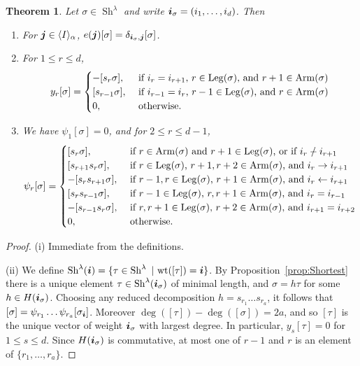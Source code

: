 \documentclass[twoside,11pt,reqno,letter]{amsart}
\numberwithin{equation}{section}
\newtheorem{Theorem}[equation]{Theorem}
\theoremstyle{definition}  %
\def\bi{\text{\boldmath$i$}}
\def\bj{\text{\boldmath$j$}}
\newcommand{\words}{\langle I \rangle}
\newcommand{\Arm}{\operatorname{Arm}}
\newcommand{\Leg}{\operatorname{Leg}}
\newcommand{\Sh}{\operatorname{Sh}}
\newcommand{\0}{{\bar 0}}
\newcommand{\1}{{\bar 1}}
\newcommand{\la}{\lambda}
\newcommand{\al}{\alpha}
\newcommand{\si}{\sigma}
\newcommand{\de}{\delta}
\def\nslash{\:\notslash\:}
\def\wt{{\operatorname{wt}}}
\begin{document}
{\begin{Theorem}\label{thm:KLRonBasis}
  Let $\si \in \Sh^\la$ and write $\bi_\si = (i_1, \dots, i_d)$. Then
  \begin{enumerate}
    \item For $\bj \in \words_\al$, $e(\bj) [\si] = \de_{\bi_\si, \bj} [\si]$.
    \item For $1 \leq r \leq d$,
          \[ y_r [\si] = \begin{cases}
             -[s_r \si],& \textup{ if $i_r = i_{r+1}$, $r \in \Leg(\si)$, and $r+1 \in \Arm(\si)$}\\
             [s_{r-1} \si],& \textup{ if $i_{r-1} = i_r$, $r-1 \in \Leg(\si)$, and $r \in \Arm(\si)$}\\
             0,& \textup{ otherwise.}
          \end{cases} \]
    \item We have $\psi_1 [\si] = 0$, and for $2 \leq r \leq d-1$, 
          \[ \psi_r [\si] = \begin{cases}
             [s_r \si],& \textup{ if $r \in \Arm(\si)$ and $r+1 \in \Leg(\si)$, or if $i_r \nslash i_{r+1}$}\\
             [s_{r+1} s_r \si],& \textup{ if $r \in \Leg(\si)$, $r+1, r+2 \in \Arm(\si)$, and $i_r \to i_{r+1}$}\\
             -[s_r s_{r+1} \si],& \textup{ if $r-1, r \in \Leg(\si)$, $r+1 \in \Arm(\si)$, and $i_r \leftarrow i_{r+1}$}\\
             [s_r s_{r-1} \si],& \textup{ if $r-1 \in \Leg(\si)$, $r, r+1 \in \Arm(\si)$, and $i_r = i_{r-1}$}\\
             -[s_{r-1} s_r \si],& \textup{ if $r, r+1 \in \Leg(\si)$, $r+2 \in \Arm(\si)$, and $i_{r+1} = i_{r+2}$}\\
             0,& \textup{ otherwise.}
          \end{cases} \]
  \end{enumerate}
\end{Theorem}






\begin{proof}
  (i) Immediate from the definitions.

  (ii) We define $\Sh^\la(\bi) = \{\tau \in \Sh^\la\ |\ \wt([\tau]) = \bi\}$. By Proposition~\ref{prop:Shortest} there is a unique element $\tau \in \Sh^\la(\bi_\si)$ of minimal length, and $\si = h \tau$ for some $h \in H(\bi_\si)$. Choosing any reduced decomposition $h = s_{r_1} \dots s_{r_a}$, it follows that $[\si] = \psi_{r_1} \dots \psi_{r_a} [\si_\bi]$. Moreover $\deg([\tau])-\deg([\si]) = 2a$, and so $[\tau]$ is the unique vector of weight $\bi_\si$ with largest degree. In particular, $y_s [\tau] = 0$ for $1 \leq s \leq d$.
Since $H(\bi_\si)$ is commutative, at most one of $r-1$ and $r$ is an element of $\{r_1, \dots, r_a\}$.


\end{proof}}
\end{document}
